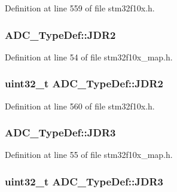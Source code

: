 Definition at line 559 of file stm32f10x.\+h.

\subsubsection[{\texorpdfstring{J\+D\+R2}{JDR2}}]{ A\+D\+C\+\_\+\+Type\+Def\+::\+J\+D\+R2}\hypertarget{struct_a_d_c___type_def_ad571450efc76ff9605624b9a59e59222}{}\label{struct_a_d_c___type_def_ad571450efc76ff9605624b9a59e59222}


Definition at line 54 of file stm32f10x\+\_\+map.\+h.

\subsubsection[{\texorpdfstring{J\+D\+R2}{JDR2}}]{ {\bf uint32\+\_\+t} A\+D\+C\+\_\+\+Type\+Def\+::\+J\+D\+R2}\hypertarget{struct_a_d_c___type_def_a898b87cab4f099bcca981cc4c9318b51}{}\label{struct_a_d_c___type_def_a898b87cab4f099bcca981cc4c9318b51}


Definition at line 560 of file stm32f10x.\+h.

\subsubsection[{\texorpdfstring{J\+D\+R3}{JDR3}}]{ A\+D\+C\+\_\+\+Type\+Def\+::\+J\+D\+R3}\hypertarget{struct_a_d_c___type_def_af9dabbc7bd0b3080df362affc728169d}{}\label{struct_a_d_c___type_def_af9dabbc7bd0b3080df362affc728169d}


Definition at line 55 of file stm32f10x\+\_\+map.\+h.

\subsubsection[{\texorpdfstring{J\+D\+R3}{JDR3}}]{ {\bf uint32\+\_\+t} A\+D\+C\+\_\+\+Type\+Def\+::\+J\+D\+R3}\hypertarget{struct_a_d_c___type_def_a40999cd0a255ef62b2340e2726695063}{}\label{struct_a_d_c___type_def_a40999cd0a255ef62b2340e2726695063}


